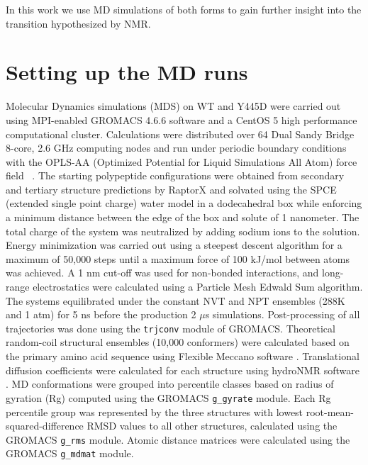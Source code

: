 In this work we use MD simulations of both \gct forms to gain further insight into the transition hypothesized by NMR.  


\section{Setting up the MD runs}

Molecular Dynamics simulations (MDS) on WT and Y445D \gct were carried out using MPI-enabled GROMACS 4.6.6 software\cite{hess2008gromacs} and a CentOS 5 high performance computational cluster. Calculations were distributed over 64 Dual Sandy Bridge 8-core, 2.6 GHz computing nodes and run under periodic boundary conditions with the OPLS-AA (Optimized Potential for Liquid Simulations All Atom) force field ~\cite{kaminski2001evaluation}.  The starting \gct polypeptide configurations were obtained from secondary and tertiary structure predictions by RaptorX \cite{kallberg2012template} and solvated using the SPCE (extended single point charge) water model in a dodecahedral box while enforcing a minimum distance between the edge of the box and solute of 1 nanometer. The total charge of the system was neutralized by adding sodium ions to the solution. Energy minimization was carried out using a steepest descent algorithm for a maximum of 50,000 steps until a maximum force of 100 kJ/mol between atoms was achieved. A 1 nm cut-off was used for non-bonded interactions, and long-range electrostatics were calculated using a Particle Mesh Edwald Sum algorithm. The systems equilibrated under the constant NVT and NPT ensembles (288K and 1 atm) for 5 ns before the production 2 $\mu$s simulations. Post-processing of all trajectories was done using the \texttt{trjconv} module of GROMACS. Theoretical random-coil structural ensembles (10,000 conformers) were calculated based on the \gct primary amino acid sequence using Flexible Meccano software \cite{ozenne2012flexible}. Translational diffusion coefficients were calculated for each structure using hydroNMR software \cite{de2000hydronmr}. 
MD conformations were grouped into percentile classes based on radius of gyration (Rg) computed using the GROMACS \texttt{g\_gyrate} module. Each Rg percentile group was represented by the three structures with lowest root-mean-squared-difference RMSD values to all other structures, calculated using the GROMACS \texttt{g\_rms} module. Atomic distance matrices were calculated using the GROMACS \texttt{g\_mdmat} module.


